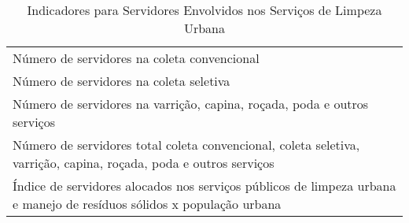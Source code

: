 \begin{table}[h!]
  \centering
  \caption{Indicadores para Servidores Envolvidos nos Serviços de Limpeza Urbana}
    \begin{tabular}{|p{25em}|}
    \rowcolor[rgb]{ .773,  .878,  .702} 
    \multicolumn{1}{P{25em}}{SERVIDORES ENVOLVIDOS NOS SERVIÇOS DE LIMPEZA URBANA} \\
    \midrule
    Número de servidores na coleta convencional \\
    \midrule
    Número de servidores na coleta seletiva \\
    \midrule
    Número de servidores na varrição, capina, roçada, poda e outros serviços \\
    \midrule
    Número de servidores total coleta convencional, coleta seletiva, varrição, capina, roçada, poda e outros serviços \\
    \midrule
    Índice de servidores alocados nos serviços públicos de limpeza urbana e manejo de resíduos sólidos x população urbana \\
    \bottomrule
    \end{tabular}%
  \label{tab:ind_servidores_slu}%
\end{table}%
